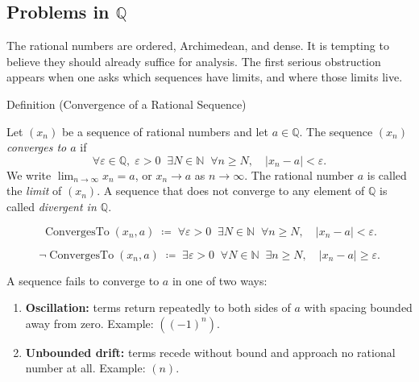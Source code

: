 
\subsection*{\texorpdfstring{Problems in $\mathbb{Q}$}{Problems in Q}}
\label{sec:problems-in-q}

\begin{remark*}
The rational numbers are ordered, Archimedean, and dense. It is tempting
to believe they should already suffice for analysis. The first serious
obstruction appears when one asks which sequences have limits, and where
those limits live.
\end{remark*}

\begin{definitionbox}{Definition (Convergence of a Rational Sequence)}
\begin{definition}
\label{def:convergent-rational-sequence}
Let $(x_n)$ be a sequence of rational numbers and let $a \in \mathbb{Q}$.
The sequence $(x_n)$ \emph{converges to $a$} if
\[
\forall \varepsilon \in \mathbb{Q},\; \varepsilon > 0 \;\;
\exists N \in \mathbb{N} \;\;
\forall n \geq N, \quad |x_n - a| < \varepsilon.
\]
We write $\lim_{n \to \infty} x_n = a$, or $x_n \to a$ as $n \to \infty$.
The rational number $a$ is called the \emph{limit} of $(x_n)$.
A sequence that does not converge to any element of $\mathbb{Q}$ is
called \emph{divergent in $\mathbb{Q}$}.
\end{definition}
\end{definitionbox}

\begin{remark*}
\[
\operatorname{ConvergesTo}(x_n, a)
\;\coloneqq\;
\forall \varepsilon > 0 \;\; \exists N \in \mathbb{N} \;\; \forall n \geq N,
\quad |x_n - a| < \varepsilon.
\]
\end{remark*}

\begin{remark*}
\[
\neg\operatorname{ConvergesTo}(x_n, a)
\;\coloneqq\;
\exists \varepsilon > 0 \;\; \forall N \in \mathbb{N} \;\; \exists n \geq N,
\quad |x_n - a| \geq \varepsilon.
\]
\end{remark*}

\begin{remark*}
A sequence fails to converge to $a$ in one of two ways:
\begin{enumerate}
  \item \textbf{Oscillation:} terms return repeatedly to both sides of $a$
        with spacing bounded away from zero. Example: $((-1)^n)$.
  \item \textbf{Unbounded drift:} terms recede without bound and approach
        no rational number at all. Example: $(n)$.
\end{enumerate}
\end{remark*}

